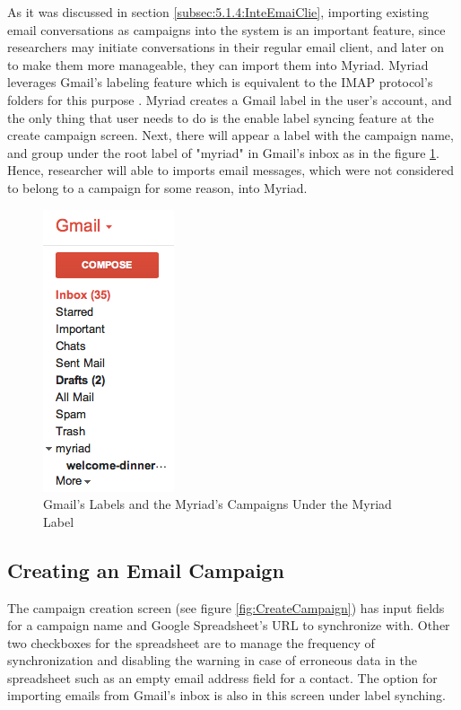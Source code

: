 As it was discussed in section \ref{subsec:5.1.4:InteEmaiClie}, importing existing email conversations as campaigns into the system is an important feature, since researchers may initiate conversations in their regular email client, and later on to make them more manageable, they can import them into Myriad. Myriad leverages Gmail's labeling feature which is equivalent to the \ac{IMAP} protocol's folders for this purpose \citep{GoogleInc.2013}. Myriad creates a Gmail label in the user's account, and the only thing that user needs to do is the enable label syncing feature at the create campaign screen. Next, there will appear a label with the campaign name, and group under the root label of "myriad" in Gmail's inbox as in the figure \ref{fig:GmailLabels}. Hence, researcher will able to imports email messages, which were not considered to belong to a campaign for some reason, into Myriad.

\clearpage

\begin{figure}[htbp]
	\centering
	\includegraphics[scale=0.60]{imgs/GmailLabels.png}
	\caption[Gmail's Labels and the Myriad's Campaigns Under the Myriad Label]{Gmail's Labels and the Myriad's Campaigns Under the Myriad Label}
	\label{fig:GmailLabels}
\end{figure}

\subsection{Creating an Email Campaign}
\label{subsec:5.2.3:CreaEmaiCamp}

The campaign creation screen (see figure \ref{fig:CreateCampaign}) has input fields for a campaign name and Google Spreadsheet's URL to synchronize with. Other two checkboxes for the spreadsheet are to manage the frequency of synchronization and disabling the warning in case of erroneous data in the spreadsheet such as an empty email address field for a contact. The option for importing emails from Gmail's inbox is also in this screen under label synching.

